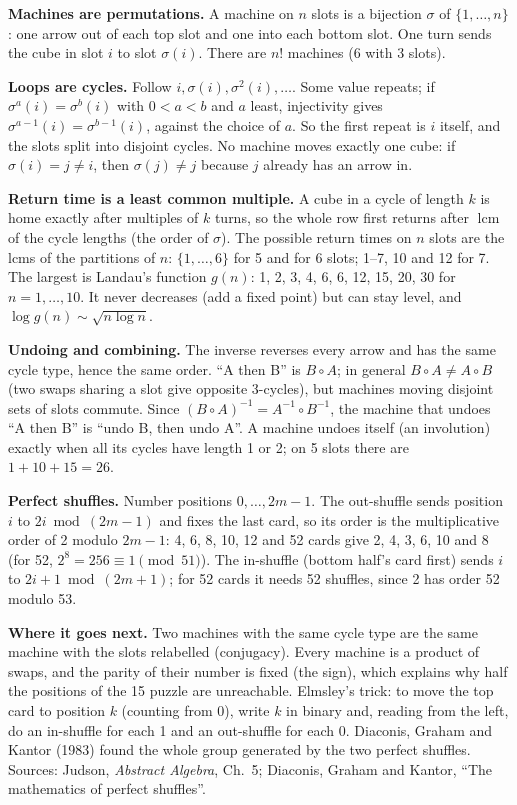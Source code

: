\documentclass[11pt,letterpaper]{extarticle}
\begin{document}
\textbf{Machines are permutations.} A machine on $n$ slots is a bijection $\sigma$ of $\{1,\dots,n\}$: one arrow out of each top slot and one into each bottom slot. One turn sends the cube in slot $i$ to slot $\sigma(i)$. There are $n!$ machines (6 with 3 slots).

\textbf{Loops are cycles.} Follow $i, \sigma(i), \sigma^2(i), \dots$. Some value repeats; if $\sigma^a(i)=\sigma^b(i)$ with $0<a<b$ and $a$ least, injectivity gives $\sigma^{a-1}(i)=\sigma^{b-1}(i)$, against the choice of $a$. So the first repeat is $i$ itself, and the slots split into disjoint cycles. No machine moves exactly one cube: if $\sigma(i)=j\ne i$, then $\sigma(j)\ne j$ because $j$ already has an arrow in.

\textbf{Return time is a least common multiple.} A cube in a cycle of length $k$ is home exactly after multiples of $k$ turns, so the whole row first returns after $\operatorname{lcm}$ of the cycle lengths (the order of $\sigma$). The possible return times on $n$ slots are the lcms of the partitions of $n$: $\{1,\dots,6\}$ for 5 and for 6 slots; 1--7, 10 and 12 for 7. The largest is Landau's function $g(n)$: 1, 2, 3, 4, 6, 6, 12, 15, 20, 30 for $n=1,\dots,10$. It never decreases (add a fixed point) but can stay level, and $\log g(n)\sim\sqrt{n\log n}$.

\textbf{Undoing and combining.} The inverse reverses every arrow and has the same cycle type, hence the same order. ``A then B'' is $B\circ A$; in general $B\circ A\ne A\circ B$ (two swaps sharing a slot give opposite 3-cycles), but machines moving disjoint sets of slots commute. Since $(B\circ A)^{-1}=A^{-1}\circ B^{-1}$, the machine that undoes ``A then B'' is ``undo B, then undo A''. A machine undoes itself (an involution) exactly when all its cycles have length 1 or 2; on 5 slots there are $1+10+15=26$.

\textbf{Perfect shuffles.} Number positions $0,\dots,2m-1$. The out-shuffle sends position $i$ to $2i \bmod (2m-1)$ and fixes the last card, so its order is the multiplicative order of 2 modulo $2m-1$: 4, 6, 8, 10, 12 and 52 cards give 2, 4, 3, 6, 10 and 8 (for 52, $2^8 = 256 \equiv 1 \pmod{51}$). The in-shuffle (bottom half's card first) sends $i$ to $2i+1 \bmod (2m+1)$; for 52 cards it needs 52 shuffles, since 2 has order 52 modulo 53.

\textbf{Where it goes next.} Two machines with the same cycle type are the same machine with the slots relabelled (conjugacy). Every machine is a product of swaps, and the parity of their number is fixed (the sign), which explains why half the positions of the 15 puzzle are unreachable. Elmsley's trick: to move the top card to position $k$ (counting from 0), write $k$ in binary and, reading from the left, do an in-shuffle for each 1 and an out-shuffle for each 0. Diaconis, Graham and Kantor (1983) found the whole group generated by the two perfect shuffles. Sources: Judson, \emph{Abstract Algebra}, Ch.~5; Diaconis, Graham and Kantor, ``The mathematics of perfect shuffles''.
\end{document}
